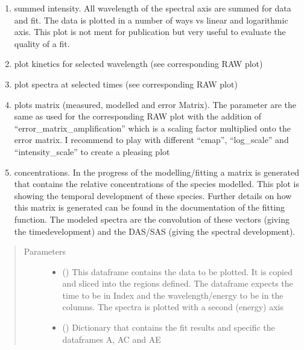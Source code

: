 \documentclass[letterpaper,10pt,english]{sphinxmanual}
\begin{document}
\begin{fulllineitems}
\begin{enumerate}
\item {} 
summed intensity. All wavelength of the spectral axis are summed for
data and fit. The data is plotted in a number of ways vs linear and
logarithmic axis. This plot is not ment for publication but very
useful to evaluate the quality of a fit.

\item {} 
plot kinetics for selected wavelength (see corresponding RAW plot)

\item {} 
plot spectra at selected times (see corresponding RAW plot)

\item {} 
plots matrix (measured, modelled and error Matrix). The parameter are
the same as used for the corresponding RAW plot with the addition of
“error\_matrix\_amplification” which is a scaling factor multiplied
onto the error matrix. I recommend to play with different “cmap”,
“log\_scale” and “intensity\_scale” to create a pleasing plot

\item {} 
concentrations. In the progress of the modelling/fitting a matrix is
generated that contains the relative concentrations of the species
modelled. This plot is showing the temporal development of these
species. Further details on how this matrix is generated can be found
in the documentation of the fitting function. The modeled spectra are
the convolution of these vectors (giving the time\sphinxhyphen{}development) and
the DAS/SAS (giving the spectral development).

\end{enumerate}
\begin{quote}\begin{description}
\item[{Parameters}] \leavevmode\begin{itemize}
\item {} 
 () \textendash{} This dataframe contains the data to be plotted. It is copied and sliced into the
regions defined. The dataframe expects the time to be in Index and the wavelength/energy
to be in the columns. The spectra is plotted with a second (energy) axis

\item {} 
 () \textendash{} Dictionary that contains the fit results and  specific the dataframes A, AC and AE


\end{itemize}
\end{description}
\end{quote}
\end{fulllineitems}
\end{document}
